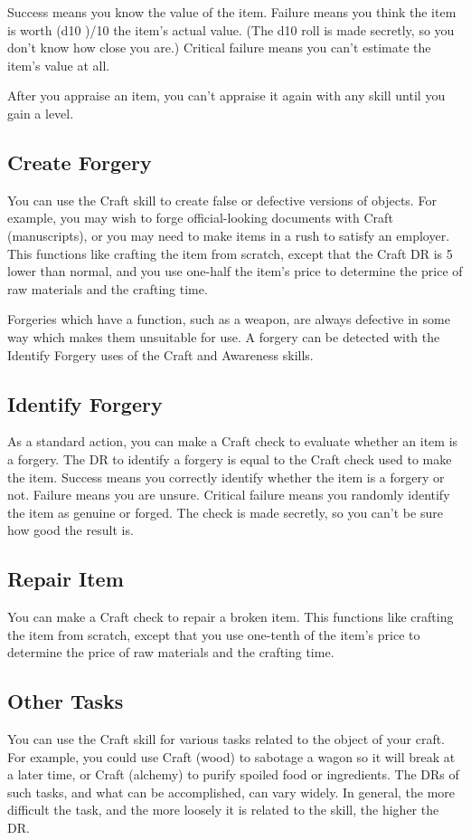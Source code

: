         Success means you know the value of the item. Failure means you think the item is worth (d10 )/10 \x the item's actual value. (The d10 roll is made secretly, so you don't know how close you are.) Critical failure means you can't estimate the item's value at all.

        After you appraise an item, you can't appraise it again with any skill until you gain a level.

    \subsection{Create Forgery}
        You can use the Craft skill to create false or defective versions of objects. For example, you may wish to forge official-looking documents with Craft (manuscripts), or you may need to make items in a rush to satisfy an employer. This functions like crafting the item from scratch, except that the Craft DR is 5 lower than normal, and you use one-half the item's price to determine the price of raw materials and the crafting time.

        Forgeries which have a function, such as a weapon, are always defective in some way which makes them unsuitable for use. A forgery can be detected with the Identify Forgery uses of the Craft and Awareness skills.

    \subsection{Identify Forgery}
        As a standard action, you can make a Craft check to evaluate whether an item is a forgery. The DR to identify a forgery is equal to the Craft check used to make the item. Success means you correctly identify whether the item is a forgery or not. Failure means you are unsure. Critical failure means you randomly identify the item as genuine or forged. The check is made secretly, so you can't be sure how good the result is.

    \subsection{Repair Item}
        You can make a Craft check to repair a broken item. This functions like crafting the item from scratch, except that you use one-tenth of the item's price to determine the price of raw materials and the crafting time.

    \subsection{Other Tasks}
        You can use the Craft skill for various tasks related to the object of your craft. For example, you could use Craft (wood) to sabotage a wagon so it will break at a later time, or Craft (alchemy) to purify spoiled food or ingredients. The DRs of such tasks, and what can be accomplished, can vary widely. In general, the more difficult the task, and the more loosely it is related to the skill, the higher the DR\@.

